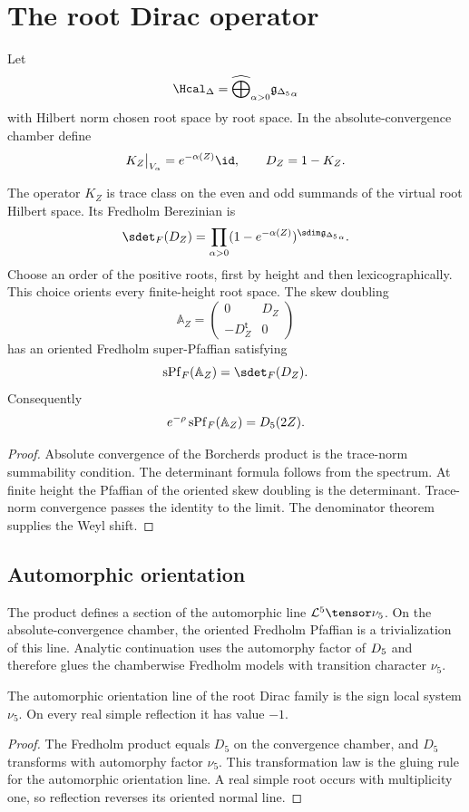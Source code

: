 \chapter{The root Dirac operator}
Let
\[
 \Hcal_\Delta=
 \widehat\bigoplus_{\alpha>0}\gIg_\alpha
\]
with Hilbert norm chosen root space by root space.  In the absolute-convergence chamber define
\[
 K_Z\big|_{V_\alpha}=e^{-\alpha(Z)}\id,
 \qquad
 D_Z=1-K_Z.
\]

\begin{theorem}
The operator $K_Z$ is trace class on the even and odd summands of the virtual root Hilbert space.  Its Fredholm Berezinian is
\[
 \sdet_F(D_Z)
 =\prod_{\alpha>0}(1-e^{-\alpha(Z)})^{\sdim\gIg_\alpha}.
\]
Choose an order of the positive roots, first by height and then lexicographically.  This choice orients every finite-height root space.  The skew doubling
\[
 \mathbb A_Z=
 \begin{pmatrix}0&D_Z\\-D_Z^{\mathsf t}&0\end{pmatrix}
\]
has an oriented Fredholm super-Pfaffian satisfying
\[
 \operatorname{sPf}_F(\mathbb A_Z)=\sdet_F(D_Z).
\]
Consequently
\[
 e^{-\rho}\operatorname{sPf}_F(\mathbb A_Z)={D_5}(2Z).
\]
\end{theorem}
\begin{proof}
Absolute convergence of the Borcherds product is the trace-norm summability condition.  The determinant formula follows from the spectrum.  At finite height the Pfaffian of the oriented skew doubling is the determinant.  Trace-norm convergence passes the identity to the limit.  The denominator theorem supplies the Weyl shift.
\end{proof}

\section{Automorphic orientation}
The product defines a section of the automorphic line $\mathcal L^5\tensor\nu_5$.  On the absolute-convergence chamber, the oriented Fredholm Pfaffian is a trivialization of this line.  Analytic continuation uses the automorphy factor of ${D_5}$ and therefore glues the chamberwise Fredholm models with transition character $\nu_5$.

\begin{corollary}
The automorphic orientation line of the root Dirac family is the sign local system $\nu_5$.  On every real simple reflection it has value $-1$.
\end{corollary}
\begin{proof}
The Fredholm product equals $D_5$ on the convergence chamber, and $D_5$ transforms with automorphy factor $\nu_5$.  This transformation law is the gluing rule for the automorphic orientation line.  A real simple root occurs with multiplicity one, so reflection reverses its oriented normal line.
\end{proof}

